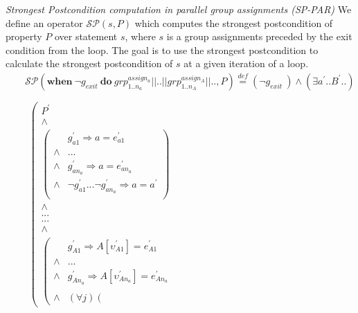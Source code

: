 \documentclass[a4paper,10pt]{article}
\newcommand{\p}[1]{\ensuremath{#1^{'}}\xspace}
\newcommand{\KWwhen}{\ensuremath{\mathrm{\textbf{when}}~}}
\newcommand{\KWdo}{\ensuremath{\mathrm{\textbf{do}}~}}
\newcommand{\gexit}{\ensuremath{\mathit{g_{exit}~}}}
\newcommand{\grpassign}[2]{\ensuremath{grp^{\mathit{assign_#1}}_{\mathit{#2}}\xspace}}
\newcommand{\impl}{\ensuremath{\Longrightarrow}}
\newcommand{\symdef}{\ensuremath{\overset{\mathit{def}}{=}}}
\begin{document}
\newcommand{\spostsym}{\ensuremath{\mathcal{SP}}\xspace}
\newcommand{\spost}[2]{\ensuremath{\spostsym(#1,#2)}}
\newcommand{\subst}[3]{\ensuremath{#1[#2 \leftarrow #3]}}

\emph{Strongest Postcondition computation in parallel group assignments (SP-PAR)}
  We define an operator \spost{s}{P} which computes the strongest postcondition of
  property $P$ over statement $s$, where $s$ is a group assignments preceded by the
  exit condition from the loop. 
  The goal is to use the strongest postcondition to calculate the strongest postcondition 
  of $s$ at a given iteration of a loop.
\begin{eqnarray*}
    && \spost{\KWwhen \neg \gexit \KWdo \grpassign{a}{1..n_a} || .. || \grpassign{A}{1..n_A} || ..}{P} \symdef 
   (\neg \gexit) \land (\exists \p{a}..\p{B}..)\\
    &&~~~\\
    &&\begin{array}{cc}  
        \left(\begin{array}{cc}
                \p{P}\\
                \land\\                             
                \left(\begin{array}{cc}
                & \p{g_{a1}} \impl a = \p{e_{a1}} \\
                \land & ...\\
                \land & \p{g_{an_a}} \impl a = \p{e_{an_a}}\\
                \land & \neg \p{g_{a1}} ... \neg \p{g_{an_a}} \impl a = \p{a}\\
              \end{array}\right)\\
              \land\\
              ...\\
              ...\\
              \land\\ 
              \left(\begin{array}{cc}
                & \p{g_{A1}} \impl A[\p{\upsilon_{A1}}] = \p{e_{A1}} \\
                \land & ...\\
                \land & \p{g_{An_a}} \impl A[\p{\upsilon_{An_a}}] = \p{e_{An_a}}\\
                &~~~~~~~~~~~~~~~~\\
                \land & (\forall j)
              \left(\begin{array}{cc}

\end{array}
\end{array}
\end{array}
\end{array}
\end{eqnarray*}
\end{document}
